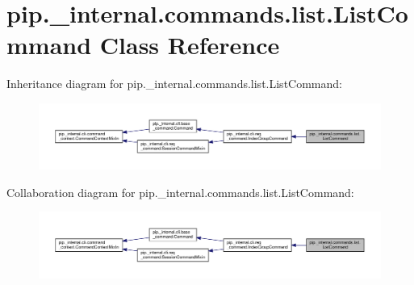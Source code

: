 \hypertarget{classpip_1_1__internal_1_1commands_1_1list_1_1ListCommand}{}\section{pip.\+\_\+internal.\+commands.\+list.\+List\+Command Class Reference}
\label{classpip_1_1__internal_1_1commands_1_1list_1_1ListCommand}


Inheritance diagram for pip.\+\_\+internal.\+commands.\+list.\+List\+Command\+:
\nopagebreak
\begin{figure}[H]
\begin{center}
\leavevmode
\includegraphics[width=350pt]{classpip_1_1__internal_1_1commands_1_1list_1_1ListCommand__inherit__graph}
\end{center}
\end{figure}


Collaboration diagram for pip.\+\_\+internal.\+commands.\+list.\+List\+Command\+:
\nopagebreak
\begin{figure}[H]
\begin{center}
\leavevmode
\includegraphics[width=350pt]{classpip_1_1__internal_1_1commands_1_1list_1_1ListCommand__coll__graph}
\end{center}
\end{figure}
